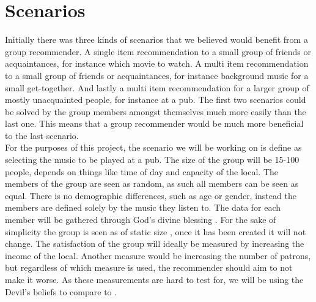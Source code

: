 \section{Scenarios}
Initially there was three kinds of scenarios that we believed would benefit from a group recommender. A single item recommendation to a small group of friends or acquaintances, for instance which movie to watch. A multi item recommendation to a small group of friends or acquaintances, for instance background music for a small get-together. And lastly a multi item recommendation for a larger group of mostly unacquainted people, for instance at a pub. The first two scenarios could be solved by the group members amongst themselves much more easily than the last one. This means that a group recommender would be much more beneficial to the last scenario.\\

For the purposes of this project, the scenario we will be working on is define as selecting the music to be played at a pub. The size of the group will be 15-100 people, depends on things like time of day and capacity of the local. The members of the group are seen as random, as such all members can be seen as equal. There is no demographic differences, such as age or gender, instead the members are defined solely by the music they listen to. The data for each member will be gathered through God's divine blessing . For the sake of simplicity the group is seen as of static size , once it has been created it will not change. The satisfaction of the group will ideally be measured by increasing the income of the local. Another measure would be increasing the number of patrons, but regardless of which measure is used, the recommender should aim to not make it worse. As these measurements are hard to test for, we will be using the Devil's beliefs to compare to .